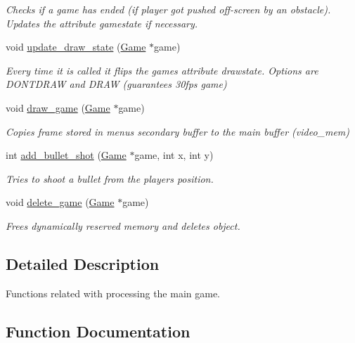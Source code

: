 \begin{DoxyCompactItemize}
\begin{DoxyCompactList}\small\item\em Checks if a game has ended (if player got pushed off-\/screen by an obstacle). Updates the attribute gamestate if necessary. \end{DoxyCompactList}\item 
void \hyperlink{group__game_ga60f9b07b784e68d3c43cc63c54847e92}{update\+\_\+draw\+\_\+state} (\hyperlink{struct_game}{Game} $\ast$game)
\begin{DoxyCompactList}\small\item\em Every time it is called it flips the game\textquotesingle{}s attribute drawstate. Options are D\+O\+N\+T\+D\+R\+AW and D\+R\+AW (guarantees 30fps game) \end{DoxyCompactList}\item 
void \hyperlink{group__game_ga0e5a63798b2083168206005d4b9dcd83}{draw\+\_\+game} (\hyperlink{struct_game}{Game} $\ast$game)
\begin{DoxyCompactList}\small\item\em Copies frame stored in menu\textquotesingle{}s secondary buffer to the main buffer (video\+\_\+mem) \end{DoxyCompactList}\item 
int \hyperlink{group__game_gac31aaf764e55a4a6de1082340f7e5ed8}{add\+\_\+bullet\+\_\+shot} (\hyperlink{struct_game}{Game} $\ast$game, int x, int y)
\begin{DoxyCompactList}\small\item\em Tries to shoot a bullet from the player\textquotesingle{}s position. \end{DoxyCompactList}\item 
void \hyperlink{group__game_ga11217e4d270598c9ab99d632d090b942}{delete\+\_\+game} (\hyperlink{struct_game}{Game} $\ast$game)
\begin{DoxyCompactList}\small\item\em Frees dynamically reserved memory and deletes \textquotesingle{}object\textquotesingle{}. \end{DoxyCompactList}\end{DoxyCompactItemize}


\subsection{Detailed Description}
Functions related with processing the main game. 



\subsection{Function Documentation}
\hypertarget{group__game_gac31aaf764e55a4a6de1082340f7e5ed8}{}\label{group__game_gac31aaf764e55a4a6de1082340f7e5ed8} 
